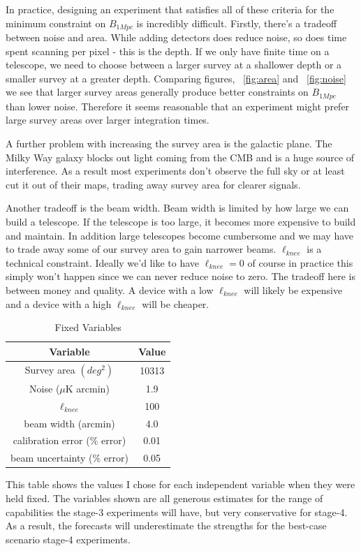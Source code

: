 In practice, designing an experiment that satisfies all of these criteria for the minimum constraint on $B_{1Mpc}$ is incredibly difficult. Firstly, there's a tradeoff between noise and area. While adding detectors does reduce noise, so does time spent scanning per pixel - this is the depth. If we only have finite time on a telescope, we need to choose between a larger survey at a shallower depth or a smaller survey at a greater depth. Comparing figures, ~\ref{fig:area} and ~\ref{fig:noise} we see that larger survey areas generally produce better constraints on $B_{1Mpc}$ than lower noise. Therefore it seems reasonable that an experiment might prefer large survey areas over larger integration times.

A further problem with increasing the survey area is the galactic plane. The Milky Way galaxy blocks out light coming from the CMB and is a huge source of interference. As a result most experiments don't observe the full sky or at least cut it out of their maps, trading away survey area for clearer signals.

Another tradeoff is the beam width. Beam width is limited by how large we can build a telescope. If the telescope is too large, it becomes more expensive to build and maintain. In addition large telescopes become cumbersome and we may have to trade away some of our survey area to gain narrower beams. $\ell_{knee}$ is a technical constraint. Ideally we'd like to have $\ell_{knee} = 0$ of course in practice this simply won't happen since we can never reduce noise to zero. The tradeoff here is between money and quality. A device with a low $\ell_{knee}$ will likely be expensive and a device with a high $\ell_{knee}$ will be cheaper.  

\begin{table}[h]
\centering
\caption{Fixed Variables}
\label{table: fixed-stats}
\begin{tabular}{l|l}
\multicolumn{1}{c}{Variable} & \multicolumn{1}{|c}{Value} \\ \hline
\multicolumn{1}{c}{Survey area $(deg^2)$} & \multicolumn{1}{|c}{10313}  \\
\multicolumn{1}{c}{Noise ($\mu$K arcmin)} & \multicolumn{1}{|c}{1.9}   \\
\multicolumn{1}{c}{$\ell_{knee}$} & \multicolumn{1}{|c}{100} \\
\multicolumn{1}{c}{beam width (arcmin)} & \multicolumn{1}{|c}{4.0}   \\
\multicolumn{1}{c}{calibration error (\% error)} & \multicolumn{1}{|c}{0.01} \\
\multicolumn{1}{c}{beam uncertainty (\% error)} & \multicolumn{1}{|c}{0.05}
\end{tabular}
\begin{flushleft}
This table shows the values I chose for each independent variable when they were held fixed. The variables shown are all generous estimates for the range of capabilities the stage-3 experiments will have, but very conservative for stage-4. As a result, the forecasts will underestimate the strengths for the best-case scenario stage-4 experiments.
\end{flushleft}
\end{table}

